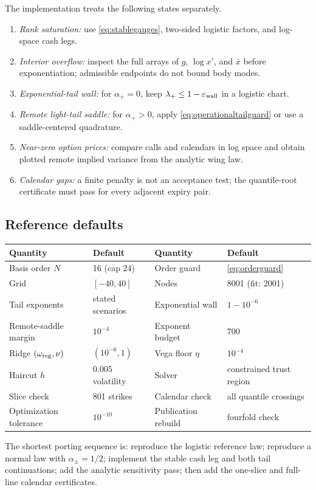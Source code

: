The implementation treats the following states separately.
\begin{enumerate}
\item \emph{Rank saturation:} use \eqref{eq:stablegauges}, two-sided logistic
factors, and log-space cash legs.
\item \emph{Interior overflow:} inspect the full arrays of $g$, $\log x'$,
and $\bar x$ before exponentiation; admissible endpoints do not bound body
modes.
\item \emph{Exponential-tail wall:} for $\alpha_+=0$, keep
$\lambda_+\le1-\varepsilon_{\rm wall}$ in a logistic chart.
\item \emph{Remote light-tail saddle:} for $\alpha_+>0$, apply
\eqref{eq:operationaltailguard} or use a saddle-centered quadrature.
\item \emph{Near-zero option prices:} compare calls and calendars in log space
and obtain plotted remote implied variance from the analytic wing law.
\item \emph{Calendar gaps:} a finite penalty is not an acceptance test; the
quantile-root certificate must pass for every adjacent expiry pair.
\end{enumerate}

\subsection{Reference defaults}

\begin{center}
\small
\begin{tabular}{@{}llll@{}}
\toprule
Quantity & Default & Quantity & Default\\
\midrule
Basis order $N$ & 16 (cap 24) & Order guard & \eqref{eq:orderguard}\\
Grid & $[-40,40]$ & Nodes & 8001 (fit: 2001)\\
Tail exponents & stated scenarios & Exponential wall & $1-10^{-6}$\\
Remote-saddle margin & $10^{-4}$ & Exponent budget & 700\\
Ridge $(\omega_{\rm reg},\nu)$ & $(10^{-6},1)$ & Vega floor $\eta$ & $10^{-4}$\\
Haircut $h$ & 0.005 volatility & Solver & constrained trust region\\
Slice check & 801 strikes & Calendar check & all quantile crossings\\
Optimization tolerance & $10^{-10}$ & Publication rebuild & fourfold check\\
\bottomrule
\end{tabular}
\label{tab:defaults}
\end{center}

The shortest porting sequence is: reproduce the logistic reference law;
reproduce a normal law with $\alpha_\pm=1/2$; implement the stable cash leg
and both tail continuations; add the analytic sensitivity pass; then add the
one-slice and full-line calendar certificates.
